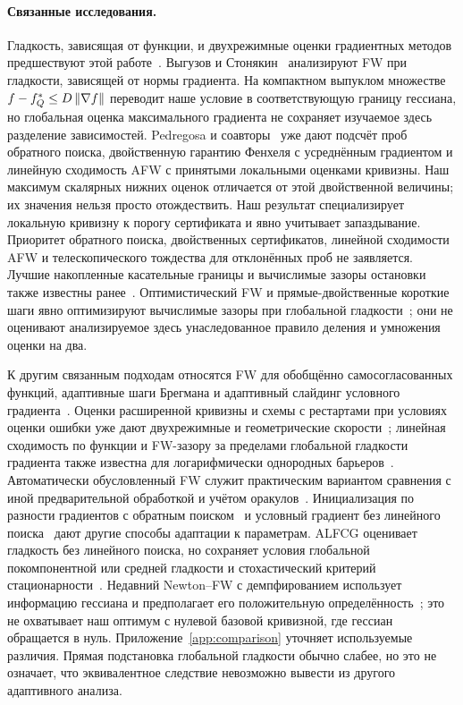 \paragraph{Связанные исследования.}
Гладкость, зависящая от функции, и двухрежимные оценки градиентных
методов предшествуют этой работе~\cite{warmup,lobanovkoloskova,lobanov}.
Выгузов и Стонякин~\cite{vyguzov} анализируют FW при гладкости,
зависящей от нормы градиента. На компактном выпуклом множестве
$f-f_Q^*\le D\left\|\nabla f\right\|$ переводит наше условие в соответствующую
границу гессиана, но глобальная оценка максимального градиента не
сохраняет изучаемое здесь разделение зависимостей.
Pedregosa и соавторы~\cite[теоремы 1, 3 и 4]{pedregosa} уже дают
подсчёт проб обратного поиска, двойственную гарантию Фенхеля с
усреднённым градиентом и линейную сходимость AFW с принятыми локальными
оценками кривизны. Наш максимум скалярных нижних оценок отличается от
этой двойственной величины; их значения нельзя просто отождествить.
Наш результат специализирует локальную кривизну к порогу сертификата
и явно учитывает запаздывание. Приоритет обратного поиска, двойственных
сертификатов, линейной сходимости AFW и телескопического тождества для
отклонённых проб не заявляется.
Лучшие накопленные касательные границы и вычислимые зазоры остановки
также известны ранее~\cite[метод 1]{freundgrigas}. Оптимистический FW и
прямые-двойственные короткие шаги явно оптимизируют вычислимые зазоры
при глобальной гладкости~\cite[утверждение 4.1]{beyondshort}; они не
оценивают анализируемое здесь унаследованное правило деления и
умножения оценки на два.

К другим связанным подходам относятся FW для обобщённо
самосогласованных функций, адаптивные шаги Брегмана и адаптивный
слайдинг условного градиента~\cite{selfconcordant,bregmanfw,adcgs}.
Оценки расширенной кривизны и схемы с рестартами при условиях оценки
ошибки уже дают двухрежимные и геометрические скорости~\cite{wirth,restartfw};
линейная сходимость по функции и FW-зазору за пределами глобальной
гладкости градиента также известна для логарифмически однородных
барьеров~\cite{zhao}. Автоматически обусловленный FW служит практическим
вариантом сравнения с иной предварительной обработкой и учётом
оракулов~\cite{autoconditioned}. Инициализация по разности градиентов с
обратным поиском~\cite{khademi} и условный градиент без линейного
поиска~\cite{yagishita} дают другие способы адаптации к параметрам.
ALFCG оценивает гладкость без линейного поиска, но сохраняет условия
глобальной покомпонентной или средней гладкости и стохастический
критерий стационарности~\cite[раздел 3]{alfcg}.
Недавний Newton--FW с демпфированием использует информацию гессиана и
предполагает его положительную определённость~\cite[раздел 1]{newtonfw};
это не охватывает наш оптимум с нулевой базовой кривизной, где гессиан
обращается в нуль.
Приложение~\ref{app:comparison} уточняет используемые различия.
Прямая подстановка глобальной гладкости обычно слабее, но это не
означает, что эквивалентное следствие невозможно вывести из другого
адаптивного анализа.

